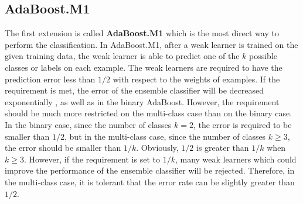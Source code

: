\subsection{AdaBoost.M1}
The first extension is called \textbf{AdaBoost.M1} which is the most direct way to perform the classification. In AdaBoost.M1, after a weak learner is trained on the given training data, the weak learner is able to predict one of the $k$ possible classes or labels on each example. The weak learners are required to have the prediction error less than $1/2$ with respect to the weights of examples. If the requirement is met, the error of the ensemble classifier will be decreased exponentially \cite{Freund1995}, as well as in the binary AdaBoost. However, the requirement should be much more restricted on the multi-class case than on the binary case. In the binary case, since the number of classes $k=2$, the error is required to be smaller than $1/2$, but in the multi-class case, since the number of classes $k\ge 3$, the error should be smaller than $1/k$. Obviously, $1/2$ is greater than $1/k$ when $k\ge 3$. However, if the requirement is set to $1/k$, many weak learners which could improve the performance of the ensemble classifier will be rejected. Therefore, in the multi-class case, it is tolerant that the error rate can be slightly greater than $1/2$.

